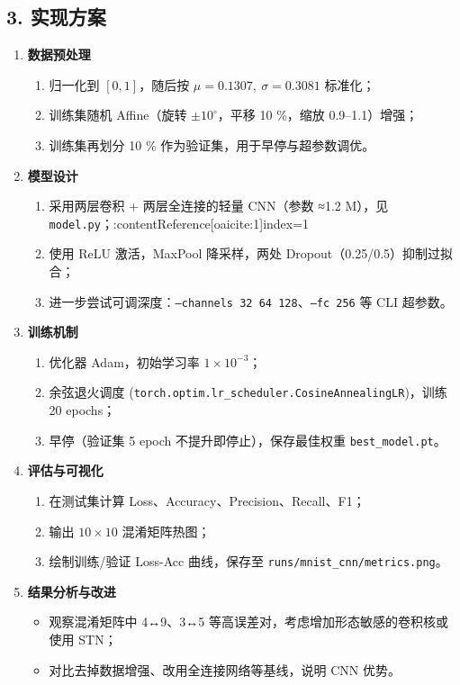\documentclass[UTF8]{article}
\begin{document}
\subsection*{3. 实现方案}
\begin{enumerate}
    \item \textbf{数据预处理}\;
          \begin{enumerate}[label*=\arabic*.]
              \item 归一化到 $[0,1]$，随后按 $\mu=0.1307,\ \sigma=0.3081$ 标准化；  
              \item 训练集随机 Affine（旋转 $\pm 10^{\circ}$，平移 10 \%，缩放 0.9–1.1）增强；  
              \item 训练集再划分 10 \% 作为验证集，用于早停与超参数调优。
          \end{enumerate}
    \item \textbf{模型设计}\;
          \begin{enumerate}[label*=\arabic*.]
              \item 采用两层卷积 + 两层全连接的轻量 CNN（参数 ≈1.2 M），见 \texttt{model.py}；:contentReference[oaicite:1]{index=1}  
              \item 使用 ReLU 激活，MaxPool 降采样，两处 Dropout（0.25/0.5）抑制过拟合；
              \item 进一步尝试可调深度：\texttt{--channels 32 64 128}、\texttt{--fc 256} 等 CLI 超参数。
          \end{enumerate}
    \item \textbf{训练机制}\;
          \begin{enumerate}[label*=\arabic*.]
              \item 优化器 Adam，初始学习率 $1\!\times\!10^{-3}$；  
              \item 余弦退火调度 (\texttt{torch.optim.lr\_scheduler.CosineAnnealingLR})，训练 20 epochs；  
              \item 早停（验证集 5 epoch 不提升即停止），保存最佳权重 \texttt{best\_model.pt}。
          \end{enumerate}
    \item \textbf{评估与可视化}\;
          \begin{enumerate}[label*=\arabic*.]
              \item 在测试集计算 Loss、Accuracy、Precision、Recall、F1；  
              \item 输出 $10\times10$ 混淆矩阵热图；  
              \item 绘制训练/验证 Loss-Acc 曲线，保存至 \texttt{runs/mnist\_cnn/metrics.png}。
          \end{enumerate}
    \item \textbf{结果分析与改进}\;
          \begin{itemize}
              \item 观察混淆矩阵中 4↔9、3↔5 等高误差对，考虑增加形态敏感的卷积核或使用 STN；  
              \item 对比去掉数据增强、改用全连接网络等基线，说明 CNN 优势。
          \end{itemize}
\end{enumerate}
\end{document}
